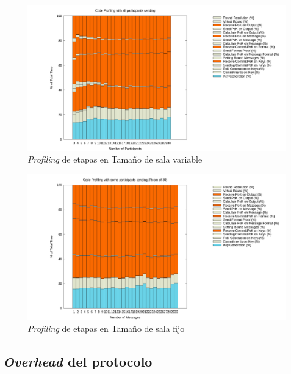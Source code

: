 \begin{figure}[H]
  \centering
    \includegraphics[scale=0.25]{logs/logs_all/profile.png}
  \caption{\emph{Profiling} de etapas en Tamaño de sala variable}
  \label{fig:profile-variable}
\end{figure}

\begin{figure}[H]
  \centering
    \includegraphics[scale=0.25]{logs/logs_partial_30/profile.png}
  \caption{\emph{Profiling} de etapas en Tamaño de sala fijo}
  \label{fig:profile-fixed}
\end{figure}

\subsection{\emph{Overhead} del protocolo}

